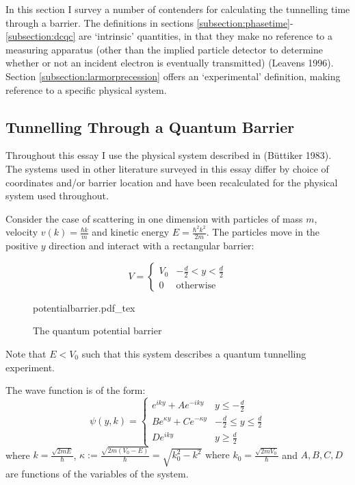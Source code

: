 \documentclass{article}
\newcommand{\incfig}[1]{%
    \def\svgwidth{10cm}
    {#1.pdf_tex}
}
\begin{document}
In this section I survey a number of contenders for calculating the tunnelling time through a barrier. The definitions in sections \ref{subsection:phasetime}-\ref{subsection:dcqc} are `intrinsic' quantities, in that they make no reference to a measuring apparatus (other than the implied particle detector to determine whether or not an incident electron is eventually transmitted) (Leavens 1996). Section \ref{subsection:larmorprecession} offers an `experimental' definition, making reference to a specific physical system.

\subsection{Tunnelling Through a Quantum Barrier}
\label{subsection:quantumbarrier}

Throughout this essay I use the physical system described in (B{\"u}ttiker 1983). The systems used in other literature surveyed in this essay differ by choice of coordinates and/or barrier location and have been recalculated for the physical system used throughout.

\noindent Consider the case of scattering in one dimension with particles of mass $m$, velocity $v(k) = \frac{\hbar k}{m}$ and kinetic energy $E = \frac{\hbar^2k^2}{2m}$. The particles move in the positive $y$ direction and interact with a rectangular barrier:

\begin{equation}
	V = 
	\begin{cases}
	V_0 & -\frac{d}{2}<y<\frac{d}{2}\\
		0 & \text{otherwise}
	\end{cases}
\end{equation}

\begin{figure}[ht]
    \centering
    \incfig{potentialbarrier}
    \caption{The quantum potential barrier}
    \label{fig:potentialbarrier}
\end{figure}

\noindent Note that $E<V_0$ such that this system describes a quantum tunnelling experiment.

\noindent The wave function is of the form:
\begin{equation}
	\psi(y,k) = 
	\begin{cases}
		e^{iky} + Ae^{-iky} & y \leq -\frac{d}{2} \\
		Be^{\kappa y} + Ce^{-\kappa y} & -\frac{d}{2} \leq y \leq \frac{d}{2} \\
		De^{iky} & y \geq \frac{d}{2}
	\end{cases}
	\label{wavefunction}
\end{equation}
\noindent where $k = \frac{\sqrt{2mE}}{\hbar}$, $\kappa := \frac{\sqrt{2m(V_0-E)}}{\hbar} = \sqrt{k_0^2-k^2} \text{ where } k_0 = \frac{\sqrt{2mV_0}}{\hbar}$ and $A,B,C,D$ are functions of the variables of the system.
\end{document}
